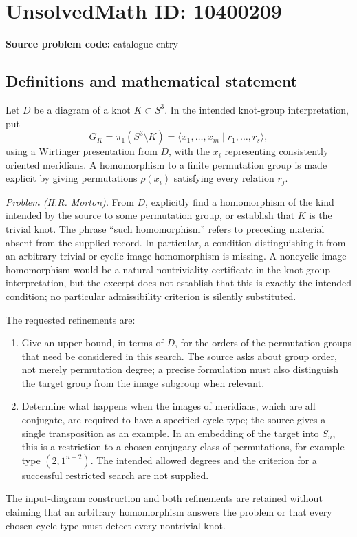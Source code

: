 \documentclass[11pt]{article}
\begin{document}
\section*{UnsolvedMath ID: 10400209}
\textbf{Source problem code:} catalogue entry
\subsection{Definitions and mathematical statement}
Let \(D\) be a diagram of a knot \(K\subset S^3\). In the intended knot-group interpretation, put
\[
 G_K=\pi_1(S^3\setminus K)
 =\langle x_1,\ldots,x_m\mid r_1,\ldots,r_s\rangle,
\]
using a Wirtinger presentation from \(D\), with the \(x_i\) representing consistently oriented meridians. A homomorphism to a finite permutation group is made explicit by giving permutations \(\rho(x_i)\) satisfying every relation \(r_j\).

\emph{Problem (H.R. Morton).} From \(D\), explicitly find a homomorphism of the kind intended by the source to some permutation group, or establish that \(K\) is the trivial knot. The phrase ``such homomorphism'' refers to preceding material absent from the supplied record. In particular, a condition distinguishing it from an arbitrary trivial or cyclic-image homomorphism is missing. A noncyclic-image homomorphism would be a natural nontriviality certificate in the knot-group interpretation, but the excerpt does not establish that this is exactly the intended condition; no particular admissibility criterion is silently substituted.

The requested refinements are:
\begin{enumerate}
\item Give an upper bound, in terms of \(D\), for the orders of the permutation groups that need be considered in this search. The source asks about group order, not merely permutation degree; a precise formulation must also distinguish the target group from the image subgroup when relevant.
\item Determine what happens when the images of meridians, which are all conjugate, are required to have a specified cycle type; the source gives a single transposition as an example. In an embedding of the target into \(S_n\), this is a restriction to a chosen conjugacy class of permutations, for example type \((2,1^{n-2})\). The intended allowed degrees and the criterion for a successful restricted search are not supplied.
\end{enumerate}
The input-diagram construction and both refinements are retained without claiming that an arbitrary homomorphism answers the problem or that every chosen cycle type must detect every nontrivial knot.
\end{document}
